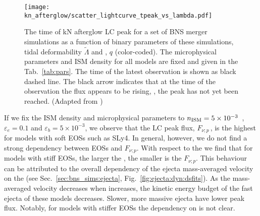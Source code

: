 \begin{figure}%
    \centering 
    \texttt{[image: kn\_afterglow/scatter\_lightcurve\_tpeak\_vs\_lambda.pdf]}
    \caption{
        The time of \ac{kN} afterglow \ac{LC} peak for a set of \ac{BNS} merger simulations 
        as a function of binary parameters of these simulations, 
        tidal deformability $\tilde{\Lambda}$ and \mr{}, $q$ (color-coded). 
        The microphysical parameters and \ac{ISM} density for all models are fixed and 
        given in the Tab.~\ref{tab:pars}.
        The time of the latest \GRB{} observation is shown as black dashed line.
        The black arrow indicates that at the time of the observation the flux appears 
        to be rising, \ie, the peak has not yet been reached.
        (Adapted from \citet{Nedora:2021eoj})
    } 
    \label{fig:lightcurve_peaks}
\end{figure}

If we fix the \ac{ISM} density and microphysical parameters to 
$n_{\text{ISM}}=5\times10^{-3}$~\gcm, $\varepsilon_e=0.1$ and $\varepsilon_b=5\times10^{-3}$, 
we observe that the \ac{LC} peak flux, $F_{\nu;p}\,$, is the highest 
for models with soft \acp{EOS} such as SLy4. 
In general, however, we do not find a strong dependency between \acp{EOS} and $F_{\nu;p}$.
With respect to the \mr{} we find that for models with stiff \acp{EOS}, 
the larger the \mr{}, the smaller is the $F_{\nu;p}$. 
%
This behaviour can be attributed to the overall dependency of the ejecta mass-averaged 
velocity on the \mr{} (see Sec.~\ref{sec:bns_sims:ejecta}, Fig.~\ref{fig:ejecta:dyn:dsfits}).
As the mass-averaged velocity decreases when \mr{} increases, the 
kinetic energy budget of the fast ejecta of these models decreases. 
Slower, more massive ejecta have lower peak flux.
Notably, for models with stiffer \acp{EOS} the dependency on \mr{} is not clear. 

